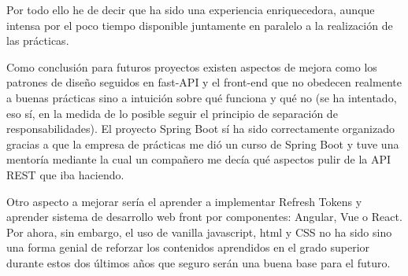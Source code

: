 \documentclass[a4paper,12pt]{report}
\begin{document}
	Por todo ello he de decir que ha sido una experiencia enriquecedora, aunque intensa por el poco tiempo disponible juntamente en paralelo a la realización de las prácticas.
	
	Como conclusión para futuros proyectos existen aspectos de mejora como los patrones de diseño seguidos en fast-API y el front-end que no obedecen realmente a buenas prácticas sino a intuición sobre qué funciona y qué no (se ha intentado, eso sí, en la medida de lo posible seguir el principio de separación de responsabilidades). El proyecto Spring Boot sí ha sido correctamente organizado gracias a que la empresa de prácticas me dió un curso de Spring Boot y tuve una mentoría mediante la cual un compañero me decía qué aspectos pulir de la API REST que iba haciendo.
	
	Otro aspecto a mejorar sería el aprender a implementar Refresh Tokens y aprender sistema de desarrollo web front por componentes: Angular, Vue o React. Por ahora, sin embargo, el uso de vanilla javascript, html y CSS no ha sido sino una forma genial de reforzar los contenidos aprendidos en el grado superior durante estos dos últimos años que seguro serán una buena base para el futuro.
	

	
	
	
	

	
	
	
	
	
	
	
	
	
	
	
	
	
	
	
	
	
	
	
	
	
	
	
	
	
	
	
	
	
	
	
	
	
	
	
	
	
	\begingroup
	\endgroup
	
\end{document}
